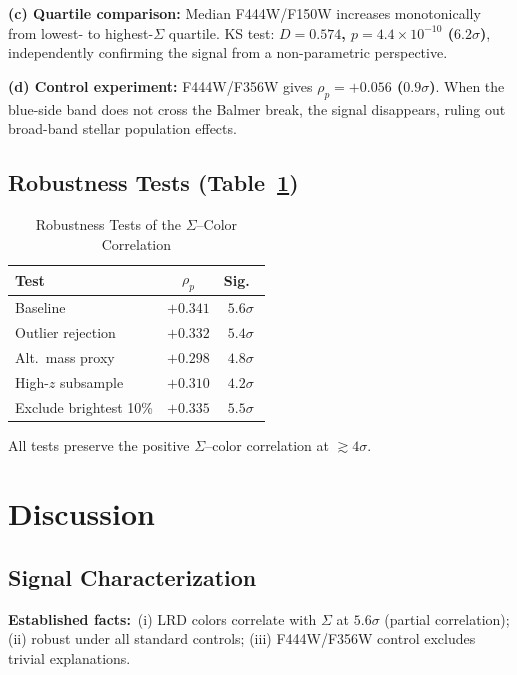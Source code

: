\documentclass[apjl,twocolumn,longbibliography,linenumbers]{aastex701}
\begin{document}
\noindent\textbf{(c) Quartile comparison:}
Median F444W/F150W increases monotonically from lowest- to highest-$\Sigma$ quartile.
KS test: \textbf{$D = 0.574$, $p = 4.4\times10^{-10}$ ($6.2\sigma$)},
independently confirming the signal from a non-parametric perspective.

\noindent\textbf{(d) Control experiment:}
F444W/F356W gives \textbf{$\rho_p = +0.056$ ($0.9\sigma$)}.
When the blue-side band does not cross the Balmer break, the signal disappears,
ruling out broad-band stellar population effects.

\subsection{Robustness Tests (Table~\ref{tab:robustness})}
\label{sec:robustness}

\begin{table}[t!]
\centering
\caption{Robustness Tests of the $\Sigma$--Color Correlation}
\label{tab:robustness}
\begin{tabular}{lcc}
\hline
Test & $\rho_p$ & Sig.\ \\
\hline
Baseline            & $+0.341$ & $5.6\sigma$ \\
Outlier rejection   & $+0.332$ & $5.4\sigma$ \\
Alt.\ mass proxy    & $+0.298$ & $4.8\sigma$ \\
High-$z$ subsample  & $+0.310$ & $4.2\sigma$ \\
Exclude brightest 10\% & $+0.335$ & $5.5\sigma$ \\
\hline
\end{tabular}
\end{table}

All tests preserve the positive $\Sigma$--color correlation at $\gtrsim 4\sigma$.



\section{Discussion}

\subsection{Signal Characterization}

\textbf{Established facts:}\ (i) LRD colors correlate with $\Sigma$ at $5.6\sigma$
(partial correlation); (ii) robust under all standard controls; (iii) F444W/F356W
control excludes trivial explanations.
\end{document}

